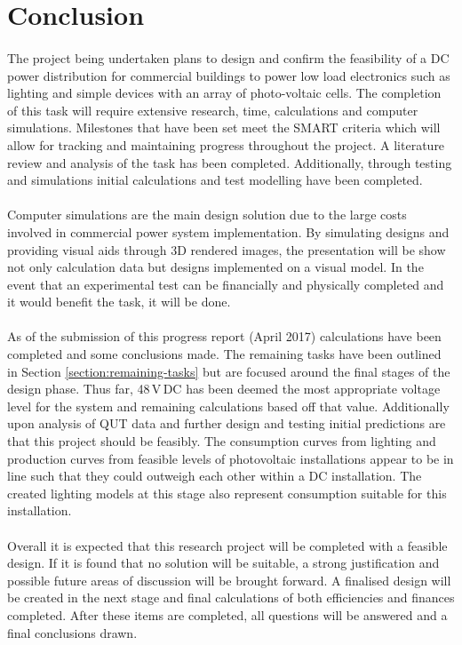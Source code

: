 \section{Conclusion}

\paragraph{}
The project being undertaken plans to design and confirm the feasibility of a DC power distribution for commercial buildings to power low load electronics such as lighting and simple devices with an array of photo-voltaic cells. The completion of this task will require extensive research, time, calculations and computer simulations. Milestones that have been set meet the SMART criteria which will allow for tracking and maintaining progress throughout the project. A literature review and analysis of the task has been completed. Additionally, through testing and simulations initial calculations and test modelling have been completed. 

\paragraph{}
Computer simulations are the main design solution due to the large costs involved in commercial power system implementation. By simulating designs and providing visual aids through 3D rendered images, the presentation will be show not only calculation data but designs implemented on a visual model. In the event that an experimental test can be financially and physically completed and it would benefit the task, it will be done.   

\paragraph{}
As of the submission of this progress report (April 2017) calculations have been completed and some conclusions made. The remaining tasks have been outlined in Section \ref{section:remaining-tasks} but are focused around the final stages of the design phase. Thus far, 48\,V\,DC has been deemed the most appropriate voltage level for the system and remaining calculations based off that value. Additionally upon analysis of QUT data and further design and testing initial predictions are that this project should be feasibly. The consumption curves from lighting and production curves from feasible levels of photovoltaic installations appear to be in line such that they could outweigh each other within a DC installation. The created lighting models at this stage also represent consumption suitable for this installation.  

\paragraph{}
Overall it is expected that this research project will be completed with a feasible design. If it is found that no solution will be suitable, a strong justification and possible future areas of discussion will be brought forward. A finalised design will be created in the next stage and final calculations of both efficiencies and finances completed. After these items are completed, all questions will be answered and a final conclusions drawn.  
\newpage